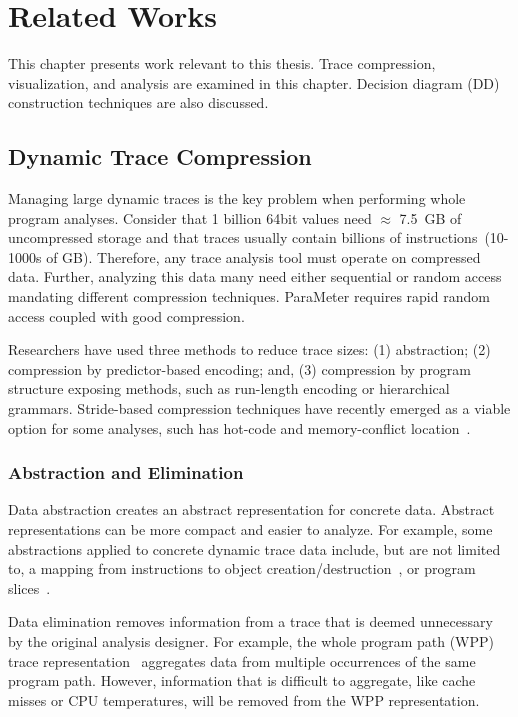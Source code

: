 \documentclass[defaultstyle,11pt]{thesis}
\begin{document}
\chapter{Related Works}
\label{chap:background}

This chapter presents work relevant to this thesis.  Trace
compression, visualization, and analysis are examined in this chapter.
Decision diagram (DD) construction techniques are also discussed.

\section{Dynamic Trace Compression}

Managing large dynamic traces is the key problem when performing whole
program analyses. Consider that 1 billion 64bit values need $\approx$
7.5~GB of uncompressed storage and that traces usually contain
billions of instructions~(10-1000s of GB). Therefore, any trace
analysis tool must operate on compressed data. Further, analyzing this
data many need either sequential or random access mandating
different compression techniques. ParaMeter requires rapid random
access coupled with good compression.

Researchers have used three methods to reduce trace sizes: (1)
abstraction; (2) compression by predictor-based encoding; and, (3)
compression by program structure exposing methods, such as run-length
encoding or hierarchical grammars.  Stride-based compression
techniques have recently emerged as a viable option for some analyses,
such has hot-code and memory-conflict
location~\cite{minjang:10:micro}.

\subsection{Abstraction and Elimination}

Data abstraction creates an abstract representation for concrete data.
Abstract representations can be more compact and easier to analyze.
For example, some abstractions applied to concrete dynamic trace data
include, but are not limited to, a mapping from instructions to object
creation/destruction~\cite{sridharan:07:pldi}, or program
slices~\cite{zhang:04:icse}.

Data elimination removes information from a trace that is deemed
unnecessary by the original analysis designer.  For example, the whole
program path (WPP) trace representation~\cite{larus:99:pldi}
aggregates data from multiple occurrences of the same program
path.  However, information that is difficult to aggregate, like cache
misses or CPU temperatures, will be removed from the WPP
representation.
\end{document}
